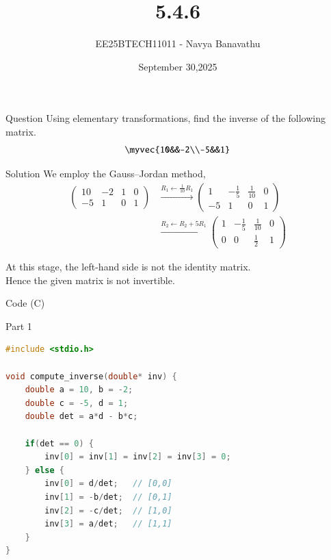 \documentclass{beamer}
\title{5.4.6}
\date{September 30,2025}
\author{EE25BTECH11011 - Navya Banavathu}
\begin{document}
\frame{\titlepage}

\begin{frame}{Question}
 Using elementary transformations, find the inverse of the following matrix. 
\begin{align*}
    \myvec{10&&-2\\-5&&1}
\end{align*}

\end{frame}

\begin{frame}{Solution}
We employ the Gauss--Jordan method,
\begin{align}
\left(\begin{array}{cc|cc}
10 & -2 & 1 & 0 \\
-5 & 1 & 0 & 1
\end{array}\right)
&\xrightarrow{R_1 \leftarrow \tfrac{1}{10}R_1}
\left(\begin{array}{cc|cc}
1 & -\tfrac{1}{5} & \tfrac{1}{10} & 0 \\
-5 & 1 & 0 & 1
\end{array}\right) \\[1em]
&\xrightarrow{R_2 \leftarrow R_2+5R_1}
\left(\begin{array}{cc|cc}
1 & -\tfrac{1}{5} & \tfrac{1}{10} & 0 \\
0 & 0 & \tfrac{1}{2} & 1
\end{array}\right)
\end{align}

At this stage, the left-hand side is not the identity matrix. \\
Hence the given matrix is not invertible.

\end{frame}


\begin{frame}[fragile]{ Code (C)}
\begin{block}{Part 1}
\begin{lstlisting}[language=C, basicstyle=\ttfamily\small, keywordstyle=\color{blue}, frame=single]
#include <stdio.h>

void compute_inverse(double* inv) {
    double a = 10, b = -2;
    double c = -5, d = 1;
    double det = a*d - b*c;

    if(det == 0) {
        inv[0] = inv[1] = inv[2] = inv[3] = 0;
    } else {
        inv[0] = d/det;   // [0,0]
        inv[1] = -b/det;  // [0,1]
        inv[2] = -c/det;  // [1,0]
        inv[3] = a/det;   // [1,1]
    }
}
\end{lstlisting}
\end{block}
\end{frame}
\end{document}

